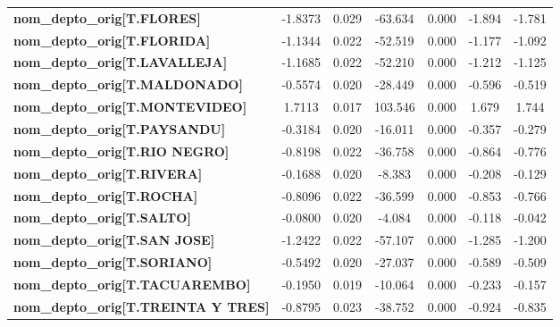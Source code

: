 \begin{center}
\begin{tabular}{lcccccc}
\textbf{nom\_depto\_orig[T.FLORES]}         &      -1.8373  &        0.029     &   -63.634  &         0.000        &       -1.894    &       -1.781     \\
\textbf{nom\_depto\_orig[T.FLORIDA]}        &      -1.1344  &        0.022     &   -52.519  &         0.000        &       -1.177    &       -1.092     \\
\textbf{nom\_depto\_orig[T.LAVALLEJA]}      &      -1.1685  &        0.022     &   -52.210  &         0.000        &       -1.212    &       -1.125     \\
\textbf{nom\_depto\_orig[T.MALDONADO]}      &      -0.5574  &        0.020     &   -28.449  &         0.000        &       -0.596    &       -0.519     \\
\textbf{nom\_depto\_orig[T.MONTEVIDEO]}     &       1.7113  &        0.017     &   103.546  &         0.000        &        1.679    &        1.744     \\
\textbf{nom\_depto\_orig[T.PAYSANDU]}       &      -0.3184  &        0.020     &   -16.011  &         0.000        &       -0.357    &       -0.279     \\
\textbf{nom\_depto\_orig[T.RIO NEGRO]}      &      -0.8198  &        0.022     &   -36.758  &         0.000        &       -0.864    &       -0.776     \\
\textbf{nom\_depto\_orig[T.RIVERA]}         &      -0.1688  &        0.020     &    -8.383  &         0.000        &       -0.208    &       -0.129     \\
\textbf{nom\_depto\_orig[T.ROCHA]}          &      -0.8096  &        0.022     &   -36.599  &         0.000        &       -0.853    &       -0.766     \\
\textbf{nom\_depto\_orig[T.SALTO]}          &      -0.0800  &        0.020     &    -4.084  &         0.000        &       -0.118    &       -0.042     \\
\textbf{nom\_depto\_orig[T.SAN JOSE]}       &      -1.2422  &        0.022     &   -57.107  &         0.000        &       -1.285    &       -1.200     \\
\textbf{nom\_depto\_orig[T.SORIANO]}        &      -0.5492  &        0.020     &   -27.037  &         0.000        &       -0.589    &       -0.509     \\
\textbf{nom\_depto\_orig[T.TACUAREMBO]}     &      -0.1950  &        0.019     &   -10.064  &         0.000        &       -0.233    &       -0.157     \\
\textbf{nom\_depto\_orig[T.TREINTA Y TRES]} &      -0.8795  &        0.023     &   -38.752  &         0.000        &       -0.924    &       -0.835     \\

\end{tabular}
\end{center}
